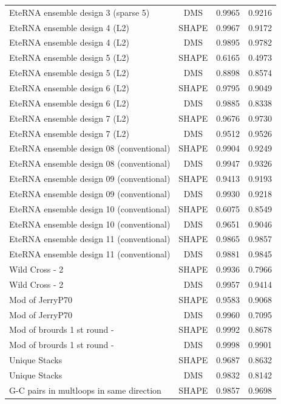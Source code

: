 \documentclass[letter]{bioinfo}
\begin{document}
\begin{center}
\begin{longtable}{lccc}
EteRNA ensemble design 3 (sparse 5)	&	DMS	&	0.9965 	&	0.9216 	\\
EteRNA ensemble design 4 (L2)	&	SHAPE	&	0.9967 	&	0.9172 	\\
EteRNA ensemble design 4 (L2)	&	DMS	&	0.9895 	&	0.9782 	\\
EteRNA ensemble design 5 (L2)	&	SHAPE	&	0.6165 	&	0.4973 	\\
EteRNA ensemble design 5 (L2)	&	DMS	&	0.8898 	&	0.8574 	\\
EteRNA ensemble design 6 (L2)	&	SHAPE	&	0.9795 	&	0.9049 	\\
EteRNA ensemble design 6 (L2)	&	DMS	&	0.9885 	&	0.8338 	\\
EteRNA ensemble design 7 (L2)	&	SHAPE	&	0.9676 	&	0.9730 	\\
EteRNA ensemble design 7 (L2)	&	DMS	&	0.9512 	&	0.9526 	\\
EteRNA ensemble design 08 (conventional)	&	SHAPE	&	0.9904 	&	0.9249 	 \\
EteRNA ensemble design 08 (conventional)	&	DMS	&	0.9947 	&	0.9326 	\\
EteRNA ensemble design 09 (conventional)	&	SHAPE	&	0.9413 	&	0.9193 	 \\
EteRNA ensemble design 09 (conventional)	&	DMS	&	0.9930 	&	0.9218 	\\
EteRNA ensemble design 10 (conventional)	&	SHAPE	&	0.6075 	&	0.8549 	 \\
EteRNA ensemble design 10 (conventional)	&	DMS	&	0.9651 	&	0.9046 	\\
EteRNA ensemble design 11 (conventional)	&	SHAPE	&	0.9865 	&	0.9857 	 \\
EteRNA ensemble design 11 (conventional)	&	DMS	&	0.9881 	&	0.9845 	\\
Wild Cross - 2	&	SHAPE	&	0.9936 	&	0.7966 	\\
Wild Cross - 2	&	DMS	&	0.9957 	&	0.9414 	\\
Mod of JerryP70	&	SHAPE	&	0.9583 	&	0.9068 	\\
Mod of JerryP70	&	DMS	&	0.9960 	&	0.7095 	\\
Mod of brourds 1 st round -	&	SHAPE	&	0.9992 	&	0.8678 	\\
Mod of brourds 1 st round -	&	DMS	&	0.9998 	&	0.9901 	\\
Unique Stacks	&	SHAPE	&	0.9687 	&	0.8632 	\\
Unique Stacks	&	DMS	&	0.9832 	&	0.8142 	\\
G-C pairs in multloops in same direction	&	SHAPE	&	0.9857 	&	0.9698 	 \\

\end{longtable}
\end{center}
\end{document}
